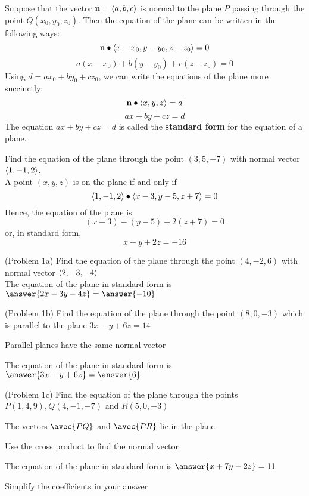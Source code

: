 \documentclass[handout]{ximera}
\begin{document}
\begin{proposition}
Suppose that the vector $\mathbf{n} = \left\langle a,b,c\right\rangle$ is normal to the plane $P$ passing through the point $Q(x_0, y_0, z_0)$.
Then the equation of the plane can be written in the following ways:
\[
\vec{n} \dotp \vector{x-x_0, y-y_0, z-z_0} = 0 %
\]
\[
a(x-x_0) + b(y-y_0) + c(z-z_0) = 0 %
\]
Using $d = ax_0 + by_0 + cz_0$,  we can write the equations of the plane more succinctly:
\[
\vec{n} \dotp \vector{x, y, z} = d %
\]
\[
ax+by+cz = d 
\]
The equation $ax+by+cz =d$ is called the \textbf{standard form} for the equation of a plane.
\end{proposition}

\begin{example}[Example 1] 
Find the equation of the plane through the point $(3, 5, -7)$ with normal vector $\left\langle 1, -1, 2\right\rangle$.\\
A point $(x, y, z)$ is on the plane if and only if 
\[
\left\langle 1, -1, 2\right\rangle \bullet \left\langle x - 3, y-5, z+7\right\rangle =0
\]
Hence, the equation of the plane is
\[
(x-3) - (y-5) + 2(z+7) = 0
\]
or, in standard form,
\[
x - y + 2z = -16
\]
\end{example}

\begin{problem}(Problem 1a)
Find the equation of the plane through the point $(4, -2, 6)$ with normal vector $\left\langle 2, -3, -4\right\rangle$\\
The equation of the plane in standard form is $\answer{2x-3y-4z} = \answer{-10}$
\end{problem}

\begin{problem}(Problem 1b)
Find the equation of the plane through the point $(8, 0, -3)$ which is parallel to the plane $3x - y + 6z = 14$\\
\begin{hint}
Parallel planes have the same normal vector
\end{hint}
The equation of the plane in standard form is $\answer{3x-y+6z} = \answer{6}$
\end{problem}

\begin{problem}(Problem 1c)
Find the equation of the plane through the points $P(1, 4, 9), Q(4, -1, -7)$ and $R(5, 0, -3)$\\
\begin{hint}
The vectors $\avec{PQ}$ and $\avec{PR}$ lie in the plane
\end{hint}
\begin{hint}
Use the cross product to find the normal vector
\end{hint}
The equation of the plane in standard form is $\answer{x+7y-2z} = 11$
\begin{hint}
Simplify the coefficients in your answer
\end{hint}
\end{problem}
\end{document}
